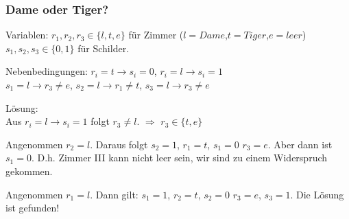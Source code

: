 \documentclass[hyperref={pdfpagelabels=false}]{beamer}
\begin{document}
\begin{frame}
\frametitle{Dame oder Tiger?}
\small  


\vspace{10pt}
Variablen: $r_1,r_2,r_3\in \{l,t,e\}$ für Zimmer ($l=Dame$,$t=Tiger$,$e=leer$)\\
\hspace{40pt} $s_1,s_2,s_3\in\{0,1\}$ für Schilder.

Nebenbedingungen: $r_i = t \rightarrow s_i=0$, $r_i=l \rightarrow s_i=1$\\
\hspace{80pt} $s_1=l \rightarrow r_3\not= e$, $s_2=l \rightarrow r_1\not= t$, $s_3=l \rightarrow r_3\not= e$

Lösung:\\ \pause 
\hspace{40pt} Aus $r_i = l \rightarrow s_i=1$ folgt $r_3\not=l$. $\Rightarrow$ $r_3\in\{t,e\}$ \pause

\hspace{40pt} Angenommen $r_2 = l$. Daraus folgt $s_2=1$, $r_1=t$, $s_1=0$ $r_3=e$. Aber dann ist $s_1=0$. D.h. Zimmer III kann nicht leer sein, wir sind zu einem Widerspruch gekommen. \pause

\hspace{40pt} Angenommen $r_1 = l$. Dann gilt: $s_1=1$, $r_2=t$, $s_2=0$ $r_3=e$, $s_3 = 1$. Die Lösung ist gefunden!
\end{frame}
\end{document}
